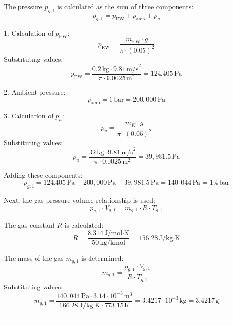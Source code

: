 The pressure \( p_{g,1} \) is calculated as the sum of three components:  
\[
p_{g,1} = p_{\text{EW}} + p_{\text{amb}} + p_u
\]  

1. Calculation of \( p_{\text{EW}} \):  
\[
p_{\text{EW}} = \frac{m_{\text{EW}} \cdot g}{\pi \cdot (0.05)^2}
\]  
Substituting values:  
\[
p_{\text{EW}} = \frac{0.2 \, \text{kg} \cdot 9.81 \, \text{m/s}^2}{\pi \cdot 0.0025 \, \text{m}^2} = 124.405 \, \text{Pa}
\]  

2. Ambient pressure:  
\[
p_{\text{amb}} = 1 \, \text{bar} = 200,000 \, \text{Pa}
\]  

3. Calculation of \( p_u \):  
\[
p_u = \frac{m_K \cdot g}{\pi \cdot (0.05)^2}
\]  
Substituting values:  
\[
p_u = \frac{32 \, \text{kg} \cdot 9.81 \, \text{m/s}^2}{\pi \cdot 0.0025 \, \text{m}^2} = 39,981.5 \, \text{Pa}
\]  

Adding these components:  
\[
p_{g,1} = 124.405 \, \text{Pa} + 200,000 \, \text{Pa} + 39,981.5 \, \text{Pa} = 140,044 \, \text{Pa} = 1.4 \, \text{bar}
\]  

Next, the gas pressure-volume relationship is used:  
\[
p_{g,1} \cdot V_{g,1} = m_{g,1} \cdot R \cdot T_{g,1}
\]  

The gas constant \( R \) is calculated:  
\[
R = \frac{8.314 \, \text{J/mol·K}}{50 \, \text{kg/kmol}} = 166.28 \, \text{J/kg·K}
\]  

The mass of the gas \( m_{g,1} \) is determined:  
\[
m_{g,1} = \frac{p_{g,1} \cdot V_{g,1}}{R \cdot T_{g,1}}
\]  
Substituting values:  
\[
m_{g,1} = \frac{140,044 \, \text{Pa} \cdot 3.14 \cdot 10^{-3} \, \text{m}^3}{166.28 \, \text{J/kg·K} \cdot 773.15 \, \text{K}} = 3.4217 \cdot 10^{-3} \, \text{kg} = 3.4217 \, \text{g}
\]  

---